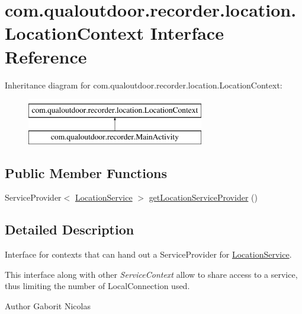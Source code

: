 \hypertarget{interfacecom_1_1qualoutdoor_1_1recorder_1_1location_1_1LocationContext}{\section{com.\-qualoutdoor.\-recorder.\-location.\-Location\-Context Interface Reference}
\label{interfacecom_1_1qualoutdoor_1_1recorder_1_1location_1_1LocationContext}
}
Inheritance diagram for com.\-qualoutdoor.\-recorder.\-location.\-Location\-Context\-:\begin{figure}[H]
\begin{center}
\leavevmode
\includegraphics[height=2.000000cm]{interfacecom_1_1qualoutdoor_1_1recorder_1_1location_1_1LocationContext}
\end{center}
\end{figure}
\subsection*{Public Member Functions}
\begin{DoxyCompactItemize}
\item 
Service\-Provider$<$ \hyperlink{classcom_1_1qualoutdoor_1_1recorder_1_1location_1_1LocationService}{Location\-Service} $>$ \hyperlink{interfacecom_1_1qualoutdoor_1_1recorder_1_1location_1_1LocationContext_ab35cad71c9ca837f4fa5c71f5f579911}{get\-Location\-Service\-Provider} ()
\end{DoxyCompactItemize}


\subsection{Detailed Description}
Interface for contexts that can hand out a Service\-Provider for \hyperlink{classcom_1_1qualoutdoor_1_1recorder_1_1location_1_1LocationService}{Location\-Service}.

This interface along with other {\itshape Service\-Context} allow to share access to a service, thus limiting the number of Local\-Connection used.

\begin{DoxyAuthor}{Author}
Gaborit Nicolas 
\end{DoxyAuthor}


